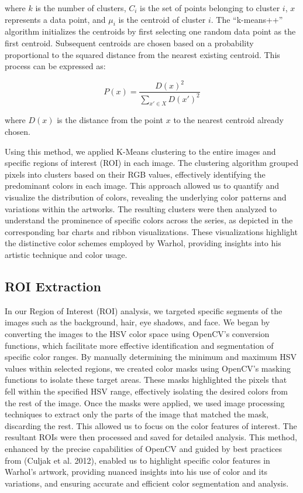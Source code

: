 \documentclass{article}
\begin{document}
where \(k\) is the number of clusters, \(C_i\) is the set of points
belonging to cluster \(i\), \(x\) represents a data point, and \(\mu_i\)
is the centroid of cluster \(i\). The ``k-means++'' algorithm
initializes the centroids by first selecting one random data point as
the first centroid. Subsequent centroids are chosen based on a
probability proportional to the squared distance from the nearest
existing centroid. This process can be expressed as:

\begin{equation}
  P(x) = \frac{D(x)^2}{\sum_{x' \in X} D(x')^2}
\end{equation}

where \(D(x)\) is the distance from the point \(x\) to the nearest
centroid already chosen.

Using this method, we applied K-Means clustering to the entire images
and specific regions of interest (ROI) in each image. The clustering
algorithm grouped pixels into clusters based on their RGB values,
effectively identifying the predominant colors in each image. This
approach allowed us to quantify and visualize the distribution of
colors, revealing the underlying color patterns and variations within
the artworks. The resulting clusters were then analyzed to understand
the prominence of specific colors across the series, as depicted in the
corresponding bar charts and ribbon visualizations. These visualizations
highlight the distinctive color schemes employed by Warhol, providing
insights into his artistic technique and color usage.

\hypertarget{roi-extraction}{%
\subsection{ROI Extraction}\label{roi-extraction}}

In our Region of Interest (ROI) analysis, we targeted specific segments
of the images such as the background, hair, eye shadows, and face. We
began by converting the images to the HSV color space using OpenCV's
conversion functions, which facilitate more effective identification and
segmentation of specific color ranges. By manually determining the
minimum and maximum HSV values within selected regions, we created color
masks using OpenCV's masking functions to isolate these target areas.
These masks highlighted the pixels that fell within the specified HSV
range, effectively isolating the desired colors from the rest of the
image. Once the masks were applied, we used image processing techniques
to extract only the parts of the image that matched the mask, discarding
the rest. This allowed us to focus on the color features of interest.
The resultant ROIs were then processed and saved for detailed analysis.
This method, enhanced by the precise capabilities of OpenCV and guided
by best practices from (Culjak et al. 2012), enabled us to highlight
specific color features in Warhol's artwork, providing nuanced insights
into his use of color and its variations, and ensuring accurate and
efficient color segmentation and analysis.
\end{document}
